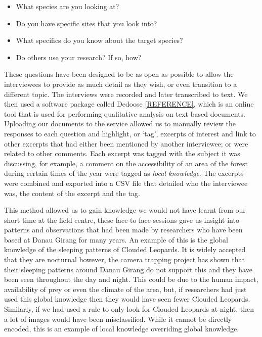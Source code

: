 			\begin{itemize}
				\item What species are you looking at?
				\item Do you have specific sites that you look into?
				\item What specifics do you know about the target species?
				\item Do others use your research? If so, how?
			\end{itemize}
			
			These questions have been designed to be as open as possible to allow the interviewees to provide as much detail as they wish, or even transition to a different topic. The interviews were recorded and later transcribed to text. We then used a software package called Dedoose \ref{REFERENCE}, which is an online tool that is used for performing qualitative analysis on text based documents. Uploading our documents to the service allowed us to manually review the responses to each question and highlight, or `tag', excerpts of interest and link to other excerpts that had either been mentioned by another interviewee; or were related to other comments. Each excerpt was tagged with the subject it was discussing, for example, a comment on the accessibility of an area of the forest during certain times of the year were tagged as \textit{local knowledge}. The excerpts were combined and exported into a CSV file that detailed who the interviewee was, the content of the excerpt and the tag.
			
			This method allowed us to gain knowledge we would not have learnt from our short time at the field centre, these face to face sessions gave us insight into patterns and observations that had been made by researchers who have been based at Danau Girang for many years. An example of this is the global knowledge of the sleeping patterns of Clouded Leopards. It is widely accepted that they are nocturnal however, the camera trapping project has shown that their sleeping patterns around Danau Girang do not support this and they have been seen throughout the day and night. This could be due to the human impact, availability of prey or even the climate of the area, but, if researchers had just used this global knowledge then they would have seen fewer Clouded Leopards. Similarly, if we had used a rule to only look for Clouded Leopards at night, then a lot of images would have been misclassified. While it cannot be directly encoded, this is an example of local knowledge overriding global knowledge.

